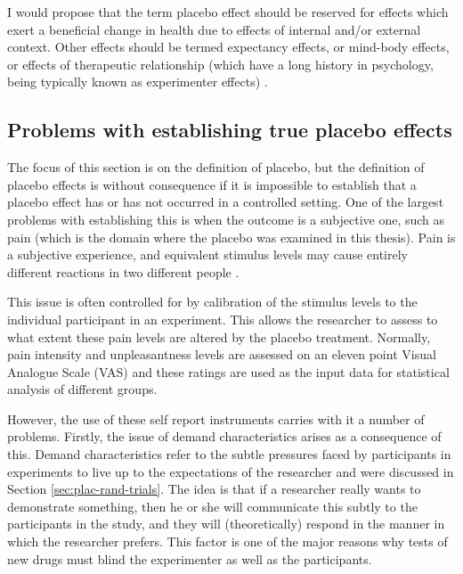I would propose that the term placebo effect should be reserved for effects which exert a beneficial change in health due to effects of internal and/or external context. Other effects should be termed expectancy effects, or mind-body effects, or effects of therapeutic relationship (which have a long history in psychology, being typically known as experimenter effects) \cite{rosenthal1969interpersonal,rosenthal1967covert,Rosenthal1956}.  

\subsection{Problems with establishing true placebo effects}

The focus of this section is on the definition of placebo, but the definition of placebo effects is without consequence if it is impossible to establish that a placebo effect has or has not occurred in a controlled setting. One of the largest problems with establishing this is when the outcome is a subjective one, such as pain (which is the domain where the placebo was examined in this thesis). Pain is a subjective experience, and equivalent stimulus levels may cause entirely different reactions  in two different people \cite{Kirsch1997}. 

This issue is often controlled for by calibration of the stimulus levels to the individual participant in an experiment. This allows the researcher to assess to what extent these pain levels are altered by the placebo treatment. Normally, pain intensity and unpleasantness levels are assessed on an eleven point Visual Analogue Scale (VAS)  and these ratings are used as the input data for statistical analysis of different groups. 

However, the use of these self report instruments carries with it a number of problems. Firstly, the issue of demand characteristics arises as a consequence of this. Demand characteristics refer to the subtle pressures faced by participants in experiments to live up to the expectations of the researcher \cite{weber1972subject} and were discussed in Section \ref{sec:plac-rand-trials}. The idea is that if a researcher really wants to demonstrate something, then he or she will communicate this subtly to the participants in the study, and they will (theoretically) respond in the manner in which the researcher prefers. This factor is one of the major reasons why tests of new drugs must blind the experimenter as well as the participants. 

